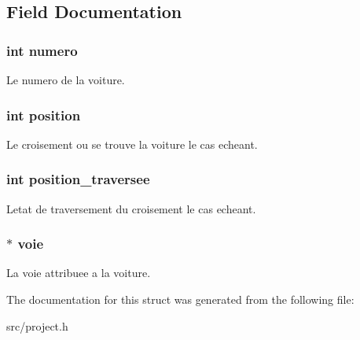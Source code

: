 \subsection{Field Documentation}
\hypertarget{struct_voiture_a2c30f43104974e72e2809fb4569804b0}{}
\subsubsection[{numero}]{\setlength{\rightskip}{0pt plus 5cm}int numero}\label{struct_voiture_a2c30f43104974e72e2809fb4569804b0}
Le numero de la voiture. \hypertarget{struct_voiture_a401e942526aac47cef94f478182486e7}{}
\subsubsection[{position}]{\setlength{\rightskip}{0pt plus 5cm}int position}\label{struct_voiture_a401e942526aac47cef94f478182486e7}
Le croisement ou se trouve la voiture le cas echeant. \hypertarget{struct_voiture_a27b8d3667f2e477b9e64e14cf46056f9}{}
\subsubsection[{position\+\_\+traversee}]{\setlength{\rightskip}{0pt plus 5cm}int position\+\_\+traversee}\label{struct_voiture_a27b8d3667f2e477b9e64e14cf46056f9}
L\textquotesingle{}etat de traversement du croisement le cas echeant. \hypertarget{struct_voiture_acce856164d15fb4096637b544821166d}{}
\subsubsection[{voie}]{$\ast$ voie}\label{struct_voiture_acce856164d15fb4096637b544821166d}
La voie attribuee a la voiture. 

The documentation for this struct was generated from the following file\+:\begin{DoxyCompactItemize}
\item 
src/project.\+h\end{DoxyCompactItemize}
